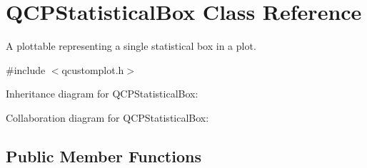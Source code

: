 \hypertarget{class_q_c_p_statistical_box}{}\section{Q\+C\+P\+Statistical\+Box Class Reference}
\label{class_q_c_p_statistical_box}


A plottable representing a single statistical box in a plot.  




{\ttfamily \#include $<$qcustomplot.\+h$>$}



Inheritance diagram for Q\+C\+P\+Statistical\+Box\+:


Collaboration diagram for Q\+C\+P\+Statistical\+Box\+:
\subsection*{Public Member Functions}
